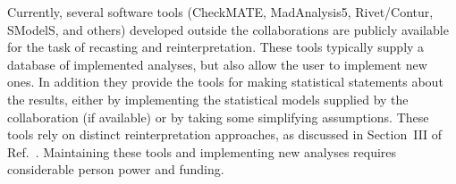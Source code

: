 \documentclass[11pt]{article}
\begin{document}








Currently, several software tools (CheckMATE, MadAnalysis5, Rivet/Contur, SModelS, and others) developed outside the collaborations are publicly available for the task of recasting and reinterpretation. These tools typically supply a database of implemented analyses, but also allow the user to implement new ones.
In addition they provide the tools for making statistical statements about the results, either by implementing the statistical models supplied by the collaboration (if available) or by taking some simplifying assumptions.
These tools rely on distinct reinterpretation approaches, as discussed in Section~III of Ref.~\cite{LHCReinterpretationForum:2020xtr}.
Maintaining these tools and implementing new analyses requires considerable person power and funding.
\end{document}
